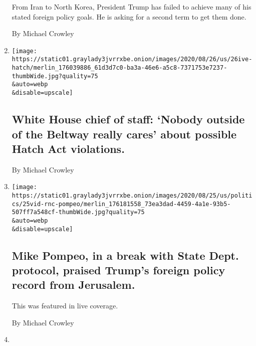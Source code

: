 \begin{enumerate}
  From Iran to North Korea, President Trump has failed to achieve many
  of his stated foreign policy goals. He is asking for a second term to
  get them done.

  By Michael Crowley
\item
  \href{/2020/08/26/us/politics/white-house-chief-of-staff-nobody-outside-of-the-beltway-really-cares-about-possible-hatch-act-violations.html}{}

  \texttt{[image: https://static01.graylady3jvrrxbe.onion/images/2020/08/26/us/26ive-hatch/merlin\_176039886\_61d3d7c0-ba3a-46e6-a5c8-7371753e7237-thumbWide.jpg?quality=75\\\&auto=webp\\\&disable=upscale]}

  \hypertarget{white-house-chief-of-staff-nobody-outside-of-the-beltway-really-cares-about-possible-hatch-act-violations}{%
  \subsection{White House chief of staff: `Nobody outside of the Beltway
  really cares' about possible Hatch Act
  violations.}\label{white-house-chief-of-staff-nobody-outside-of-the-beltway-really-cares-about-possible-hatch-act-violations}}

  By Michael Crowley
\item
  \href{/live/2020/08/25/us/rnc-convention-election/mike-pompeo-in-a-break-with-state-dept-protocol-praised-trumps-foreign-policy-record-from-jerusalem}{}

  \texttt{[image: https://static01.graylady3jvrrxbe.onion/images/2020/08/25/us/politics/25vid-rnc-pompeo/merlin\_176181558\_73ea3dad-4459-4a1e-93b5-507ff7a548cf-thumbWide.jpg?quality=75\\\&auto=webp\\\&disable=upscale]}

  \hypertarget{mike-pompeo-in-a-break-with-state-dept-protocol-praised-trumps-foreign-policy-record-from-jerusalem}{%
  \subsection{Mike Pompeo, in a break with State Dept. protocol, praised
  Trump's foreign policy record from
  Jerusalem.}\label{mike-pompeo-in-a-break-with-state-dept-protocol-praised-trumps-foreign-policy-record-from-jerusalem}}

  This was featured in live coverage.

  By Michael Crowley
\item
  \href{/live/2020/08/25/us/rnc-convention-election/larry-kudlow-gave-trump-exaggerated-credit-for-coronavirus-relief-efforts}{}


\end{enumerate}
